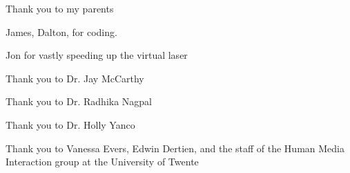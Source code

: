 Thank you to my parents%

James, Dalton, for coding. 

Jon for vastly speeding up the virtual laser

Thank you to Dr. Jay McCarthy%

Thank you to Dr. Radhika Nagpal%

Thank you to Dr. Holly Yanco%

Thank you to Vanessa Evers, Edwin Dertien, and the staff of the Human Media Interaction group at the University of Twente%
